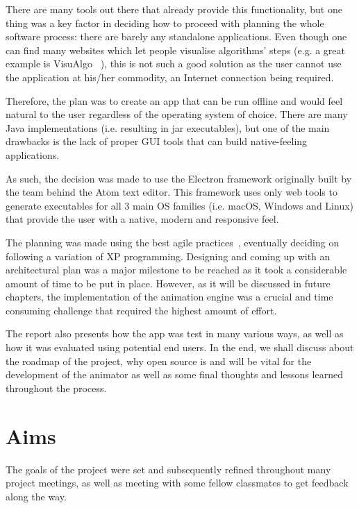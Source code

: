 \documentclass{l4proj}
\begin{document}
There are many tools out there that already provide this functionality, but one thing was a key factor in deciding how to proceed with planning the whole software process: there are barely any standalone applications. Even though one can find many websites which let people visualise algorithms' steps (e.g. a great example is VisuAlgo ~\cite{visualgo}), this is not such a good solution as the user cannot use the application at his/her commodity, an Internet connection being required.

Therefore, the plan was to create an app that can be run offline and would feel natural to the user regardless of the operating system of choice. There are many Java implementations (i.e. resulting in jar executables), but one of the main drawbacks is the lack of proper GUI tools that can build native-feeling applications.

As such, the decision was made to use the Electron framework originally built by the team behind the Atom text editor. This framework uses only web tools to generate executables for all 3 main OS families (i.e. macOS, Windows and Linux) that provide the user with a native, modern and responsive feel.

The planning was made using the best agile practices~\cite{agile-methodologies}, eventually deciding on following a variation of XP programming. Designing and coming up with an architectural plan was a major milestone to be reached as it took a considerable amount of time to be put in place. However, as it will be discussed in future chapters, the implementation of the animation engine was a crucial and time consuming challenge that required the highest amount of effort.

The report also presents how the app was test in many various ways, as well as how it was evaluated using potential end users. In the end, we shall discuss about the roadmap of the project, why open source is and will be vital for the development of the animator as well as some final thoughts and lessons learned throughout the process.

\section{Aims}

The goals of the project were set and subsequently refined throughout many project meetings, as well as meeting with some fellow classmates to get feedback along the way.
\end{document}
